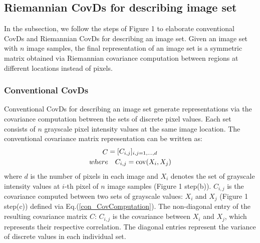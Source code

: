 \documentclass[review]{elsarticle}
\begin{document}
\subsection{Riemannian CovDs for describing image set}
	\indent In the subsection, we follow the steps of Figure 1 to elaborate conventional CovDs and Riemannian CovDs for describing an image set. Given an image set with $n$ image samples, the final representation of an image set is a symmetric matrix obtained via Riemannian covariance computation between  regions at different locations instead of pixels. 
\subsubsection{Conventional CovDs}
	\indent Conventional CovDs for describing an image set generate representations via the covariance computation between the sets of discrete pixel values. Each set consists of $n$ grayscale pixel intensity values at the same image location. The conventional covariance matrix representation can be written as:
\begin{equation}
\label{con_CovDs}
\begin{split}
\mathop C = [C_{i,j}]{_{i,j=1,...,d}} \quad \quad\\
where \quad  {C_{i,j}}={\rm cov}(X_i,X_j)
\end{split}
\end{equation} 
where $d$ is the number of pixels in each image and $X_i$ denotes the set of grayscale intensity values at $i$-th pixel of $n$ image samples (Figure 1 step(b)).  $C_{i,j}$ is the covariance computed between two sets of grayscale values: $X_i$ and  $X_j$ (Figure 1 step(c)) defined  via {Eq.(\ref{con_CovComputation})}. The non-diagonal entry of the resulting covariance matrix $C$: $C_{i,j}$ is the covariance between $X_i$ and  $X_j$, which represents their respective correlation. The diagonal entries represent the variance of discrete values in each individual set.
\end{document}
